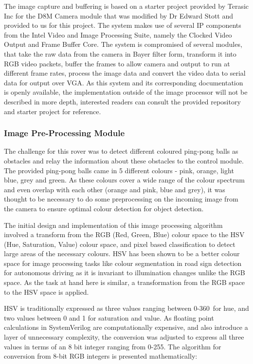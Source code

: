 \documentclass[a4paper]{article}
\begin{document}
The image capture and buffering is based on a starter project provided
by Terasic Inc for the D8M Camera module that was modified by Dr Edward Stott 
\cite{EEE2Rover} and provided to us for this project. The system makes use of 
several IP components from the Intel Video and Image Processing Suite,
namely the Clocked Video Output and Frame Buffer Core. The system is compromised
of several modules, that take the raw data from the camera in Bayer filter form\cite{TerasicD8MWeb},
transform it into RGB video packets, buffer the frames to allow camera and output
to run at different frame rates, process the image data and convert the video 
data to serial data for output over VGA.\cite{EEE2Rover} As this system and its 
corresponding documentation is openly available, the implementation outside of 
the image processor will not be described in more depth, interested readers can 
consult the provided repository and starter project for reference. 

\subsubsection{Image Pre-Processing Module}

The challenge for this rover was to detect different coloured ping-pong balls as
obstacles and relay the information about these obstacles to the control module. 
The provided ping-pong balls came in 5 different colours - pink, orange, light 
blue, grey and green. As these colours cover a wide range of the colour spectrum
and even overlap with each other (orange and pink, blue and grey), it was thought 
to be necessary to do some preprocessing on the incoming image from the camera 
to ensure optimal colour detection for object detection.  
 


The initial design and implementation of this image processing algorithm involved
a transform from the RGB (Red, Green, Blue) colour space to the HSV (Hue, 
Saturation, Value) colour space, and pixel based classification to detect large
areas of the necessary colours.  HSV has been shown to be a better colour space
for image processing tasks like colour segmentation in road sign detection for 
autonomous driving as it is invariant to illumination changes unlike the RGB 
space.\cite{ali2013performance} As the task at hand here is similar, a transformation
from the RGB space to the HSV space is applied. 

HSV is traditionally expressed as three values ranging between 0-360\degree\  
for hue, and two values between 0 and 1 for saturation and value.\cite{10.1145/965139.807361}
As floating point calculations in SystemVerilog are computationally expensive, 
and also introduce a layer of unnecessary complexity, the conversion was adjusted
to express all three values in terms of an 8 bit integer ranging from 0-255. The
algorithm for conversion from 8-bit RGB integers is presented mathematically:
\end{document}
